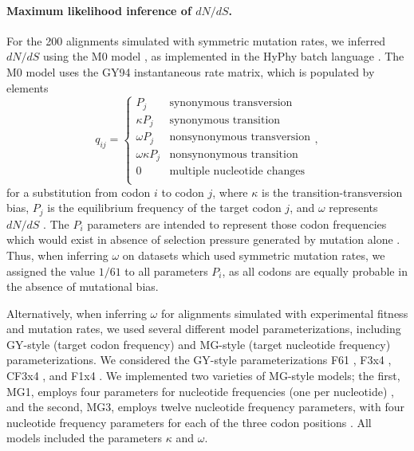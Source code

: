\documentclass{pnastwo}
\begin{document}
\begin{article}
\paragraph{Maximum likelihood inference of $dN/dS$.}
For the 200 alignments simulated with symmetric mutation rates, we inferred $dN/dS$ using the M0 model \cite{Yangetal2000}, as implemented in the HyPhy batch language \cite{KosakovskyPondetal2005}. The M0 model uses the GY94 instantaneous rate matrix, which is populated by elements
\begin{equation}\label{eq:GY94}
q_{ij} = \left\{ 
	\begin{array}{rl}
	P_j                &\text{synonymous transversion} \\
	\kappa P_j           &\text{synonymous transition} \\
 	\omega P_j           &\text{nonsynonymous transversion} \\
 	\omega \kappa P_j    &\text{nonsynonymous transition} \\
	0                    &\text{multiple nucleotide changes} \\             
	\end{array} \right.,
\end{equation} for a substitution from codon $i$ to codon $j$, where $\kappa$ is the transition-transversion bias, $P_j$ is the equilibrium frequency of the target codon $j$, and $\omega$ represents $dN/dS$ \cite{GoldmanYang1994,NielsenYang1998}. The $P_i$ parameters are intended to represent those codon frequencies which would exist in absence of selection pressure generated by mutation alone \cite{GoldmanYang1994,MuseGaut1994,YN00,Yang2006}. Thus, when inferring $\omega$ on datasets which used symmetric mutation rates, we assigned the value $1/61$ to all parameters $P_i$, as all codons are  equally probable in the absence of mutational bias.

Alternatively, when inferring $\omega$ for alignments simulated with experimental fitness and mutation rates, we used several different model parameterizations, including GY-style \cite{GoldmanYang1994} (target codon frequency) and MG-style \cite{MuseGaut1994} (target nucleotide frequency) parameterizations. We considered the GY-style parameterizations F61 \cite{GoldmanYang1994}, F3x4 \cite{GoldmanYang1994}, CF3x4 \cite{KosakovskyPond2010}, and F1x4 \cite{MuseGaut1994}. We implemented two varieties of MG-style models; the first, MG1, employs four parameters for nucleotide frequencies (one per nucleotide) \cite{MuseGaut1994}, and the second, MG3, employs twelve nucleotide frequency parameters, with four nucleotide frequency parameters for each of the three codon positions \cite{KosakovskyPondMuse2005}. All models included the parameters $\kappa$ and $\omega$. 


\end{article}
\end{document}
